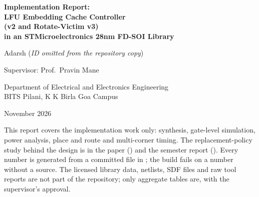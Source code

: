\documentclass[11pt,a4paper]{article}
\newcommand{\reportdate}{November 2026}
\newcommand{\studentid}{\textit{ID omitted from the repository copy}}
\begin{document}
\begin{titlepage}
\centering
\vspace*{2cm}
{\LARGE\bfseries Implementation Report:\\[6pt] LFU Embedding Cache Controller\\[4pt] (v2 and Rotate-Victim v3)\\[4pt]
in an STMicroelectronics 28nm FD-SOI Library\par}
\vspace{1.6cm}
{\large Adarsh (\studentid)\par}
\vspace{0.4cm}
{\large Supervisor: Prof.\ Pravin Mane\par}
\vspace{1.2cm}
{\large Department of Electrical and Electronics Engineering\\ BITS Pilani, K K Birla Goa Campus\par}
\vspace{1.2cm}
{\large \reportdate\par}
\vfill
\begin{minipage}{0.86\textwidth}
\small
This report covers the implementation work only: synthesis, gate-level simulation, power analysis, place and route
and multi-corner timing. The replacement-policy study behind the design is in the paper
() and the semester report (). Every number is generated from
a committed file in ; the build fails on a number without a source. The licensed library data, netlists,
SDF files and raw tool reports are not part of the repository; only aggregate tables are, with the supervisor's
approval.
\end{minipage}
\end{titlepage}

\tableofcontents
\newpage

\end{document}
